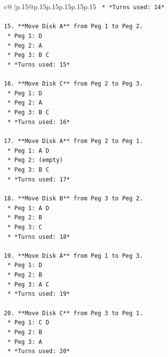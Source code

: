 \documentclass{article}
\begin{document}
{\begin{supertabular}{c@{$\;$}|p{.15\linewidth}@{}p{.15\linewidth}p{.15\linewidth}p{.15\linewidth}p{.15\linewidth}p{.15\linewidth}}
{{{\texttt{    *   *Turns used: 14*} \\
\\ 
\texttt{15. **Move Disk A** from Peg 1 to Peg 2.} \\
\texttt{    *   Peg 1: D} \\
\texttt{    *   Peg 2: A} \\
\texttt{    *   Peg 3: B C} \\
\texttt{    *   *Turns used: 15*} \\
\\ 
\texttt{16. **Move Disk C** from Peg 2 to Peg 3.} \\
\texttt{    *   Peg 1: D} \\
\texttt{    *   Peg 2: A} \\
\texttt{    *   Peg 3: B C} \\
\texttt{    *   *Turns used: 16*} \\
\\ 
\texttt{17. **Move Disk A** from Peg 2 to Peg 1.} \\
\texttt{    *   Peg 1: A D} \\
\texttt{    *   Peg 2: (empty)} \\
\texttt{    *   Peg 3: B C} \\
\texttt{    *   *Turns used: 17*} \\
\\ 
\texttt{18. **Move Disk B** from Peg 3 to Peg 2.} \\
\texttt{    *   Peg 1: A D} \\
\texttt{    *   Peg 2: B} \\
\texttt{    *   Peg 3: C} \\
\texttt{    *   *Turns used: 18*} \\
\\ 
\texttt{19. **Move Disk A** from Peg 1 to Peg 3.} \\
\texttt{    *   Peg 1: D} \\
\texttt{    *   Peg 2: B} \\
\texttt{    *   Peg 3: A C} \\
\texttt{    *   *Turns used: 19*} \\
\\ 
\texttt{20. **Move Disk C** from Peg 3 to Peg 1.} \\
\texttt{    *   Peg 1: C D} \\
\texttt{    *   Peg 2: B} \\
\texttt{    *   Peg 3: A} \\
\texttt{    *   *Turns used: 20*} \\
}}}
\end{supertabular}}
\end{document}
